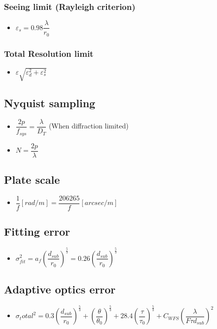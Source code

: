 \documentclass[]{report}
\newcommand \tab[1][1cm]{\hspace*{#1}}
\newcommand{\itemt}{\item \tab}
\begin{document}
\subsubsection{Seeing limit (Rayleigh criterion)}			
\begin{itemize}
\itemt \( \varepsilon_s = 0.98 \dfrac{\lambda}{r_0} \)
\end{itemize}

\subsubsection{Total Resolution limit}			
\begin{itemize}
\itemt \( \varepsilon \sqrt{\varepsilon_d^2 + \varepsilon_s^2} \)
\end{itemize}

\subsection{Nyquist sampling}		
\begin{itemize}
\itemt \( \dfrac{2p}{f_{sys}} = \dfrac{\lambda}{D_T} \) \tab (When diffraction limited)
\itemt \( N = \dfrac{2p}{\lambda} \)
\end{itemize}			

\subsection{Plate scale}		
\begin{itemize}
\itemt \( \dfrac{1}{f} [rad/m] = \dfrac{206265}{f} [arcsec/m] \)
\end{itemize}			

\subsection{Fitting error}		
\begin{itemize}
\itemt \( \sigma_{fit}^2 = a_f (\dfrac{d_{sub}}{r_0})^{\frac{5}{3}} = 0.26 (\dfrac{d_{sub}}{r_0})^{\frac{5}{3}} \)
\end{itemize}

\subsection{Adaptive optics error}
\begin{itemize}
\itemt \( \sigma_total^2 = 0.3(\dfrac{d_{sub}}{r_0})^{\frac{5}{3}} + (\dfrac{\theta}{\theta_0})^{\frac{5}{3}} + 28.4(\dfrac{\tau}{\tau_0})^{\frac{5}{3}} + C_{WFS} (\dfrac{\lambda}{F\tau d_{sub}})^2 \)
\end{itemize}
		 
\end{document}
